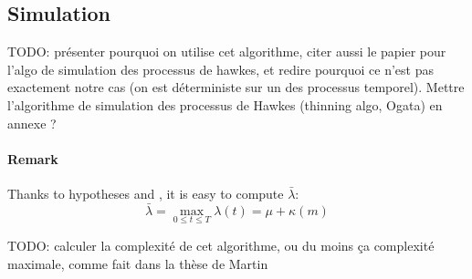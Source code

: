 \subsection{Simulation}

TODO: présenter pourquoi on utilise cet algorithme, citer aussi le papier pour l'algo de simulation des processus de hawkes, et redire pourquoi ce n'est pas exactement notre cas (on est déterministe sur un des processus temporel).
Mettre l'algorithme de simulation des processus de Hawkes (thinning algo, Ogata) en annexe ?

\cite{ogata1981lewis, chen2016thinning, lewis1979simulation}




\paragraph{Remark} Thanks to hypotheses  and , it is easy to compute $\bar{\lambda}$:
\begin{equation}
    \bar{\lambda} = \max_{0\leq t \leq T} \lambda(t) = \mu + \kappa(m)
\end{equation}

TODO: calculer la complexité de cet algorithme, ou du moins ça complexité maximale, comme fait dans la thèse de Martin